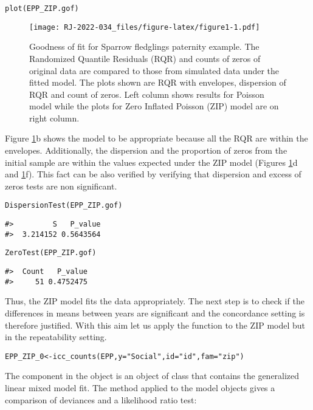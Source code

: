 \begin{verbatim}
plot(EPP_ZIP.gof)
\end{verbatim}

\begin{figure}
\centering
\texttt{[image: RJ-2022-034\_files/figure-latex/figure1-1.pdf]}
\caption{\label{fig:figure1}Goodness of fit for Sparrow fledglings paternity example. The Randomized Quantile Residuals (RQR) and counts of zeros of original data are compared to those from simulated data under the fitted model. The plots shown are RQR with envelopes, dispersion of RQR and count of zeros. Left column shows results for Poisson model while the plots for Zero Inflated Poisson (ZIP) model are on right column.}
\end{figure}

Figure \ref{fig:figure1}b shows the model to be appropriate because all the RQR are within the envelopes. Additionally, the dispersion and the proportion of zeros from the initial sample are within the values expected under the ZIP model (Figures \ref{fig:figure1}d and \ref{fig:figure1}f). This fact can be also verified by verifying that dispersion and excess of zeros tests are non significant.

\begin{verbatim}
DispersionTest(EPP_ZIP.gof)
\end{verbatim}

\begin{verbatim}
#>         S   P_value
#>  3.214152 0.5643564
\end{verbatim}

\begin{verbatim}
ZeroTest(EPP_ZIP.gof)
\end{verbatim}

\begin{verbatim}
#>  Count   P_value
#>     51 0.4752475
\end{verbatim}

Thus, the ZIP model fits the data appropriately. The next step is to check if the differences in means between years are significant and the concordance setting is therefore justified. With this aim let us apply the function  to the ZIP model but in the repeatability setting.

\begin{verbatim}
EPP_ZIP_0<-icc_counts(EPP,y="Social",id="id",fam="zip")
\end{verbatim}

The component  in the  object is an object of class  that contains the generalized linear mixed model fit. The  method applied to the model objects gives a comparison of deviances and a likelihood ratio test:

